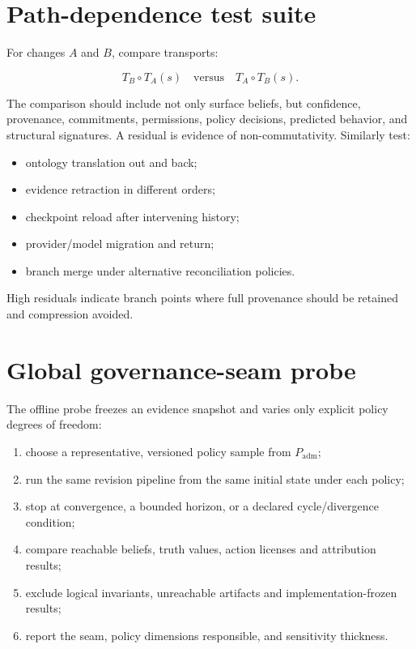 \documentclass[11pt,oneside]{report}
\newcommand{\Padm}{P_{\mathrm{adm}}}
\begin{document}
\section{Path-dependence test suite}

For changes $A$ and $B$, compare transports:

\[
T_B\circ T_A(s) \quad\text{versus}\quad T_A\circ T_B(s).
\]

The comparison should include not only surface beliefs, but confidence, provenance, commitments, permissions, policy decisions, predicted behavior, and structural signatures. A residual is evidence of non-commutativity. Similarly test:

\begin{itemize}
  \item ontology translation out and back;
  \item evidence retraction in different orders;
  \item checkpoint reload after intervening history;
  \item provider/model migration and return;
  \item branch merge under alternative reconciliation policies.
\end{itemize}

High residuals indicate branch points where full provenance should be retained and compression avoided.

\section{Global governance-seam probe}

The offline probe freezes an evidence snapshot and varies only explicit policy degrees of freedom:

\begin{enumerate}
  \item choose a representative, versioned policy sample from $\Padm$;
  \item run the same revision pipeline from the same initial state under each policy;
  \item stop at convergence, a bounded horizon, or a declared cycle/divergence condition;
  \item compare reachable beliefs, truth values, action licenses and attribution results;
  \item exclude logical invariants, unreachable artifacts and implementation-frozen results;
  \item report the seam, policy dimensions responsible, and sensitivity thickness.
\end{enumerate}
\end{document}
